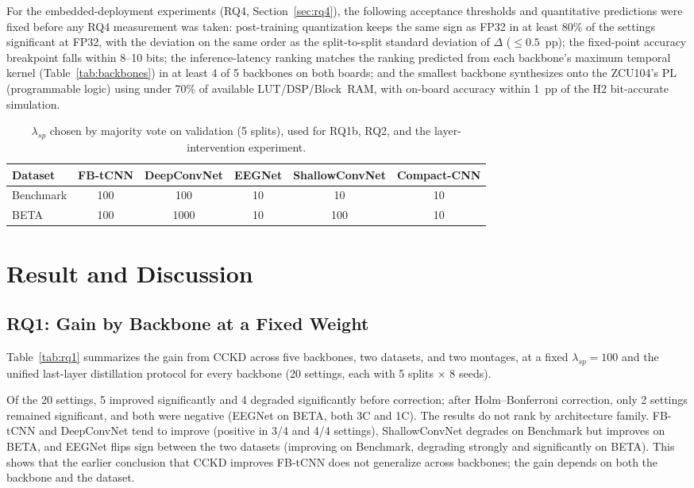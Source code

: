 \documentclass[11pt,a4paper,twoside,asymmetric]{article}
\begin{document}
For the embedded-deployment experiments (RQ4, Section~\ref{sec:rq4}), the following acceptance thresholds and quantitative predictions were fixed before any RQ4 measurement was taken: post-training quantization keeps the same sign as FP32 in at least 80\% of the settings significant at FP32, with the deviation on the same order as the split-to-split standard deviation of $\Delta$ ($\leq 0.5$~pp); the fixed-point accuracy breakpoint falls within 8--10 bits; the inference-latency ranking matches the ranking predicted from each backbone's maximum temporal kernel (Table~\ref{tab:backbones}) in at least 4 of 5 backbones on both boards; and the smallest backbone synthesizes onto the ZCU104's PL (programmable logic) using under 70\% of available LUT/DSP/Block~RAM, with on-board accuracy within 1~pp of the H2 bit-accurate simulation.

\begin{table}[htbp]
\caption{$\lambda_{sp}$ chosen by majority vote on validation (5 splits), used for RQ1b, RQ2, and the layer-intervention experiment.}
\label{tab:lambda}
\begin{center}
\begin{tabular}{lccccc}
\toprule
Dataset & FB-tCNN & DeepConvNet & EEGNet & ShallowConvNet & Compact-CNN \\
\midrule
Benchmark & 100 & 100 & 10 & 10 & 10 \\
BETA & 100 & 1000 & 10 & 100 & 10 \\
\bottomrule
\end{tabular}
\end{center}
\end{table}

\section{Result and Discussion}

\subsection{RQ1: Gain by Backbone at a Fixed Weight}
\label{sec:rq1}

Table~\ref{tab:rq1} summarizes the gain from CCKD across five backbones, two datasets, and two montages, at a fixed $\lambda_{sp}=100$ and the unified last-layer distillation protocol for every backbone (20 settings, each with 5 splits $\times$ 8 seeds).

Of the 20 settings, 5 improved significantly and 4 degraded significantly before correction; after Holm--Bonferroni correction, only 2 settings remained significant, and both were negative (EEGNet on BETA, both 3C and 1C). The results do not rank by architecture family. FB-tCNN and DeepConvNet tend to improve (positive in 3/4 and 4/4 settings), ShallowConvNet degrades on Benchmark but improves on BETA, and EEGNet flips sign between the two datasets (improving on Benchmark, degrading strongly and significantly on BETA). This shows that the earlier conclusion that CCKD improves FB-tCNN \cite{R82} does not generalize across backbones; the gain depends on both the backbone and the dataset.
\end{document}
